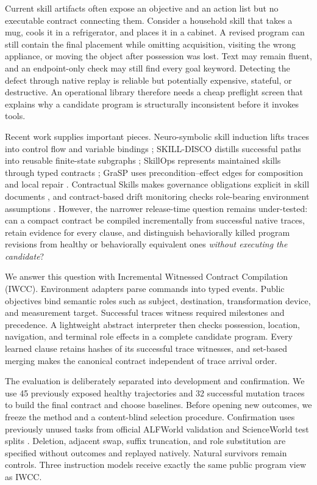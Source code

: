 \documentclass[10pt]{article}
\begin{document}
Current skill artifacts often expose an objective and an action list but no executable contract connecting them. Consider a household skill that takes a mug, cools it in a refrigerator, and places it in a cabinet. A revised program can still contain the final placement while omitting acquisition, visiting the wrong appliance, or moving the object after possession was lost. Text may remain fluent, and an endpoint-only check may still find every goal keyword. Detecting the defect through native replay is reliable but potentially expensive, stateful, or destructive. An operational library therefore needs a cheap preflight screen that explains why a candidate program is structurally inconsistent before it invokes tools.

Recent work supplies important pieces. Neuro-symbolic skill induction lifts traces into control flow and variable bindings \citep{shao2026nsi}; SKILL-DISCO distills successful paths into reusable finite-state subgraphs \citep{guo2026skilldisco}; SkillOps represents maintained skills through typed contracts \citep{pu2026skillops}; GraSP uses precondition--effect edges for composition and local repair \citep{xia2026grasp}. Contractual Skills makes governance obligations explicit in skill documents \citep{liu2026contractual}, and contract-based drift monitoring checks role-bearing environment assumptions \citep{fan2026drift}. However, the narrower release-time question remains under-tested: can a compact contract be compiled incrementally from successful native traces, retain evidence for every clause, and distinguish behaviorally killed program revisions from healthy or behaviorally equivalent ones \emph{without executing the candidate}?

We answer this question with Incremental Witnessed Contract Compilation (IWCC). Environment adapters parse commands into typed events. Public objectives bind semantic roles such as subject, destination, transformation device, and measurement target. Successful traces witness required milestones and precedence. A lightweight abstract interpreter then checks possession, location, navigation, and terminal role effects in a complete candidate program. Every learned clause retains hashes of its successful trace witnesses, and set-based merging makes the canonical contract independent of trace arrival order.

The evaluation is deliberately separated into development and confirmation. We use 45 previously exposed healthy trajectories and 32 successful mutation traces to build the final contract and choose baselines. Before opening new outcomes, we freeze the method and a content-blind selection procedure. Confirmation uses \TaskCount{} previously unused tasks from official ALFWorld validation and ScienceWorld test splits \citep{shridhar2021alfworld,wang2022scienceworld}. Deletion, adjacent swap, suffix truncation, and role substitution are specified without outcomes and replayed natively. Natural survivors remain controls. Three instruction models receive exactly the same public program view as IWCC.
\end{document}
